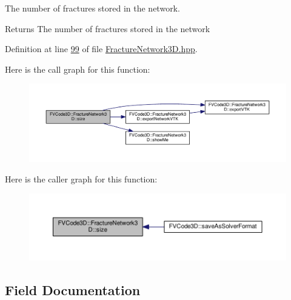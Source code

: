 The number of fractures stored in the network. 

\begin{DoxyReturn}{Returns}
The number of fractures stored in the network 
\end{DoxyReturn}


Definition at line \hyperlink{FractureNetwork3D_8hpp_source_l00099}{99} of file \hyperlink{FractureNetwork3D_8hpp_source}{Fracture\+Network3\+D.\+hpp}.



Here is the call graph for this function\+:
\nopagebreak
\begin{figure}[H]
\begin{center}
\leavevmode
\includegraphics[width=350pt]{classFVCode3D_1_1FractureNetwork3D_ab5c6a79673390ecf2edd54232993054c_cgraph}
\end{center}
\end{figure}




Here is the caller graph for this function\+:
\nopagebreak
\begin{figure}[H]
\begin{center}
\leavevmode
\includegraphics[width=350pt]{classFVCode3D_1_1FractureNetwork3D_ab5c6a79673390ecf2edd54232993054c_icgraph}
\end{center}
\end{figure}




\subsection{Field Documentation}
